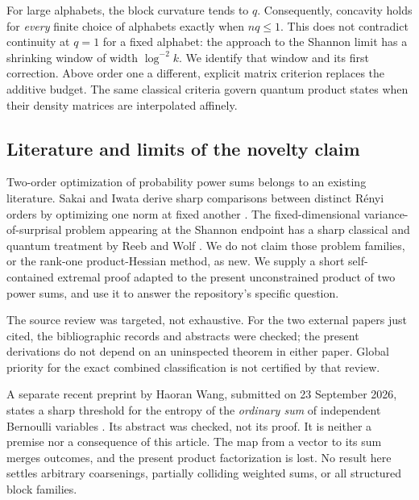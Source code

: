 \documentclass[11pt]{article}
\numberwithin{equation}{section}
\theoremstyle{definition}
\theoremstyle{remark}
\begin{document}
For large alphabets, the block curvature tends to $q$. Consequently,
concavity holds for \emph{every} finite choice of alphabets exactly when
$nq\leq1$. This does not contradict continuity at $q=1$ for a fixed
alphabet: the approach to the Shannon limit has a shrinking window of
width $\log^{-2}k$. We identify that window and its first correction.
Above order one a different, explicit matrix criterion replaces the
additive budget. The same classical criteria govern quantum product
states when their density matrices are interpolated affinely.

\subsection{Literature and limits of the novelty claim}
Two-order optimization of probability power sums belongs to an existing
literature. Sakai and Iwata derive sharp comparisons between distinct
R\'enyi orders by optimizing one norm at fixed another \cite{bep:ae:sakai}.
The fixed-dimensional variance-of-surprisal problem appearing at the
Shannon endpoint has a sharp classical and quantum treatment by Reeb and
Wolf \cite{bep:ae:reeb}. We do not claim those problem families, or the
rank-one product-Hessian method, as new. We supply a short self-contained
extremal proof adapted to the present unconstrained product of two power
sums, and use it to answer the repository's specific question.

The source review was targeted, not exhaustive. For the two external
papers just cited, the bibliographic records and abstracts were checked;
the present derivations do not depend on an uninspected theorem in either
paper. Global priority for the exact combined classification is not
certified by that review.

A separate recent preprint by Haoran Wang, submitted on 23 September
2026, states a sharp threshold for the entropy of the \emph{ordinary sum}
of independent Bernoulli variables \cite{bep:pe:Wang}. Its abstract was checked,
not its proof. It is neither a premise nor a consequence of this article.
The map from a vector to its sum merges outcomes, and the present product
factorization is lost. No result here settles arbitrary coarsenings,
partially colliding weighted sums, or all structured block families.
\end{document}
